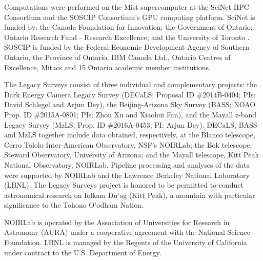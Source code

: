 \documentclass[twocolumn]{aastex631}
\begin{document}
Computations were performed on the Mist supercomputer at the SciNet HPC Consortium and the SOSCIP Consortium's GPU computing platform.
SciNet is funded by: the Canada Foundation for Innovation; the Government of Ontario; Ontario Research Fund - Research Excellence; and the University of Toronto \citep[][]{Loken_2010}.
SOSCIP is funded by the Federal Economic Development Agency of Southern Ontario, the Province of Ontario, IBM Canada Ltd., Ontario Centres of Excellence, Mitacs and 15 Ontario academic member institutions.

The Legacy Surveys consist of three individual and complementary projects: the Dark Energy Camera Legacy Survey (DECaLS; Proposal ID \#2014B-0404; PIs: David Schlegel and Arjun Dey), the Beijing-Arizona Sky Survey (BASS; NOAO Prop. ID \#2015A-0801; PIs: Zhou Xu and Xiaohui Fan), and the Mayall z-band Legacy Survey (MzLS; Prop. ID \#2016A-0453; PI: Arjun Dey). DECaLS, BASS and MzLS together include data obtained, respectively, at the Blanco telescope, Cerro Tololo Inter-American Observatory, NSF's NOIRLab; the Bok telescope, Steward Observatory, University of Arizona; and the Mayall telescope, Kitt Peak National Observatory, NOIRLab. Pipeline processing and analyses of the data were supported by NOIRLab and the Lawrence Berkeley National Laboratory (LBNL). The Legacy Surveys project is honored to be permitted to conduct astronomical research on Iolkam Du'ag (Kitt Peak), a mountain with particular significance to the Tohono O'odham Nation.

NOIRLab is operated by the Association of Universities for Research in Astronomy (AURA) under a cooperative agreement with the National Science Foundation. LBNL is managed by the Regents of the University of California under contract to the U.S. Department of Energy.
\end{document}
